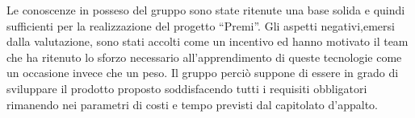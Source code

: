 Le conoscenze in posseso del gruppo \GRUPPO sono state ritenute una base solida e quindi sufficienti per la realizzazione del progetto “Premi”.
Gli aspetti negativi,emersi dalla valutazione, sono stati accolti come un incentivo ed hanno motivato il team che ha ritenuto lo sforzo necessario all’apprendimento di queste tecnologie come un occasione invece che un peso.
Il gruppo perciò suppone di essere in grado di sviluppare il prodotto proposto soddisfacendo tutti i requisiti obbligatori rimanendo nei parametri di costi e tempo previsti dal capitolato d’appalto.
